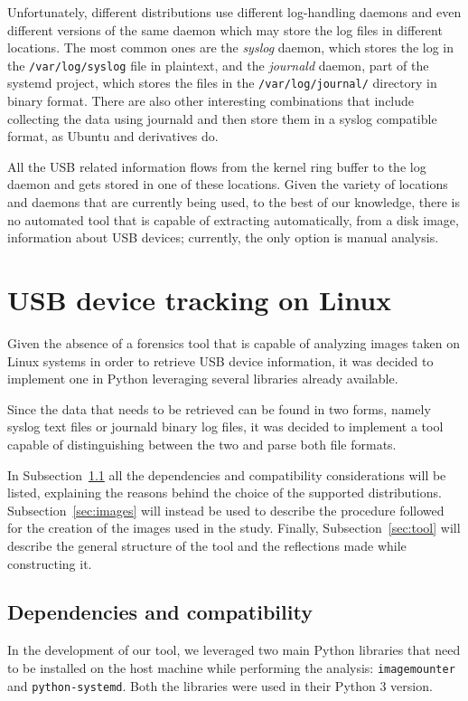 \documentclass[a4paper]{article}
\begin{document}
Unfortunately, different distributions use different log-handling daemons and
even different versions of the same daemon which may store the log files in
different locations. The most common ones are the \emph{syslog} daemon, which
stores the log in the \texttt{/var/log/syslog} file in plaintext, and the
\emph{journald} daemon, part of the systemd project, which stores the files in
the \texttt{/var/log/journal/} directory in binary format. There are also other
interesting combinations that include collecting the data using journald and
then store them in a syslog compatible format, as Ubuntu and derivatives
do.~\cite{poettering2012journal}

All the USB related information flows from the kernel ring buffer to the log
daemon and gets stored in one of these locations. Given the variety of locations
and daemons that are currently being used, to the best of our knowledge, there
is no automated tool that is capable of extracting automatically, from a disk
image, information about USB devices; currently, the only option is manual
analysis.

\section{USB device tracking on Linux}
\label{sec:contrib}
Given the absence of a forensics tool that is capable of analyzing images taken
on Linux systems in order to retrieve USB device information, it was decided to
implement one in Python leveraging several libraries already available.

Since the data that needs to be retrieved can be found in two forms, namely
syslog text files or journald binary log files, it was decided to implement a
tool capable of distinguishing between the two and parse both file formats.

In Subsection~\ref{sec:prems} all the dependencies and compatibility
considerations will be listed, explaining the reasons behind the choice of the
supported distributions. Subsection~\ref{sec:images} will instead be used to
describe the procedure followed for the creation of the images used in the
study. Finally, Subsection~\ref{sec:tool} will describe the general structure of
the tool and the reflections made while constructing it.

\subsection{Dependencies and compatibility}
\label{sec:prems}
In the development of our tool, we leveraged two main Python libraries that need
to be installed on the host machine while performing the analysis:
\texttt{imagemounter} and \texttt{python-systemd}. Both the libraries were used in
their Python 3 version.
\end{document}
